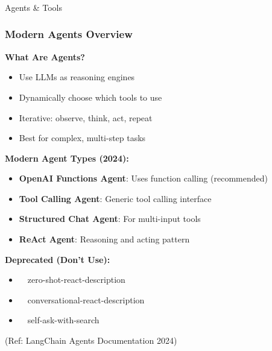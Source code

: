 \begin{frame}[fragile]\frametitle{}
\begin{center}
{\Large Agents \& Tools}
\end{center}
\end{frame}

\begin{frame}[fragile]\frametitle{Modern Agents Overview}

\textbf{What Are Agents?}
\begin{itemize}
\item Use LLMs as reasoning engines
\item Dynamically choose which tools to use
\item Iterative: observe, think, act, repeat
\item Best for complex, multi-step tasks
\end{itemize}

\textbf{Modern Agent Types (2024):}
\begin{itemize}
\item \textbf{OpenAI Functions Agent}: Uses function calling (recommended)
\item \textbf{Tool Calling Agent}: Generic tool calling interface
\item \textbf{Structured Chat Agent}: For multi-input tools
\item \textbf{ReAct Agent}: Reasoning and acting pattern
\end{itemize}

\textbf{Deprecated (Don't Use):}
\begin{itemize}
\item ~~zero-shot-react-description~~
\item ~~conversational-react-description~~
\item ~~self-ask-with-search~~
\end{itemize}

{\tiny (Ref: LangChain Agents Documentation 2024)}
\end{frame}

